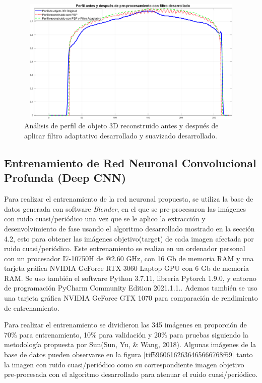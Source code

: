 \documentclass[10pt,letterpaper]{article}
\begin{document}
\begin{figure}[H]
	\centering
    \includegraphics[height=6cm,width=12cm]{tifs/tif58.png}
    \caption{Análisis de perfil de objeto 3D reconstruido antes y después de aplicar filtro adaptativo desarrollado y suavizado desarrollado.}
    \label{tif58}
\end{figure}

\subsection{Entrenamiento de Red Neuronal Convolucional Profunda (Deep CNN)}

Para realizar el entrenamiento de la red neuronal propuesta, se utiliza la base de datos generada con software \textit{Blender}, en el que se pre-procesaron las imágenes con ruido cuasi/periódico una vez que se le aplico la extracción y desenvolvimiento de fase usando el algoritmo desarrollado mostrado en la sección 4.2, esto para obtener las imágenes objetivo(target) de cada imagen afectada por ruido cuasi/periódico. Este entrenamiento se realizo en un ordenador personal con un procesador I7-10750H de @2.60 GHz, con 16 Gb de memoria RAM y una tarjeta gráfica NVIDIA GeForce RTX 3060 Laptop GPU con 6 Gb de memoria RAM. Se uso también el software Python 3.7.11, libreria Pytorch 1.9.0, y entorno de programación PyCharm Community Edition 2021.1.1..  Ademas también se uso una tarjeta gráfica NVIDIA GeForce GTX 1070 para comparación de rendimiento de entrenamiento.

Para realizar el entrenamiento se dividieron las 345 imágenes en proporción de 70\% para entrenamiento, 10\% para validación y 20\% para pruebas siguiendo la metodología propuesta por Sun(Sun, Yu, \& Wang, 2018)\cite{Sun:Yu}. Algunas imágenes de la base de datos pueden observarse en la figura \ref{tif59606162636465666768f69} tanto la imagen con ruido cuasi/periódico como su correspondiente imagen objetivo pre-procesada con el algoritmo desarrollado para atenuar el ruido cuasi/periódico.
\end{document}
